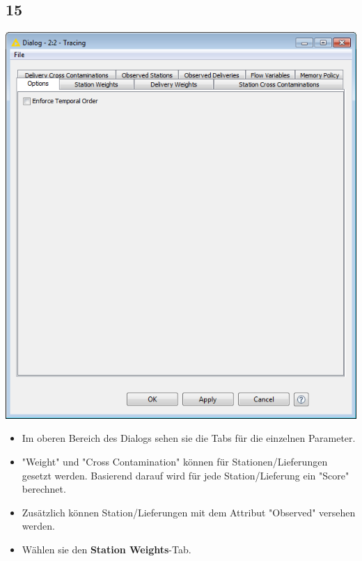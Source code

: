\documentclass{beamer}
\begin{document}
\subsection{15}
\begin{frame}
	\begin{center}
  		\includegraphics[height=0.5\textheight]{15.png}
	\end{center}
	\begin{itemize}
		\item Im oberen Bereich des Dialogs sehen sie die Tabs für die einzelnen Parameter.
		\item "Weight" und "Cross Contamination" können für Stationen/Lieferungen gesetzt werden. Basierend darauf wird für jede Station/Lieferung ein "Score" berechnet.
		\item Zusätzlich können Station/Lieferungen mit dem Attribut "Observed" versehen werden.
		\item Wählen sie den \textbf{Station Weights}-Tab.
	\end{itemize}
\end{frame}
\end{document}

